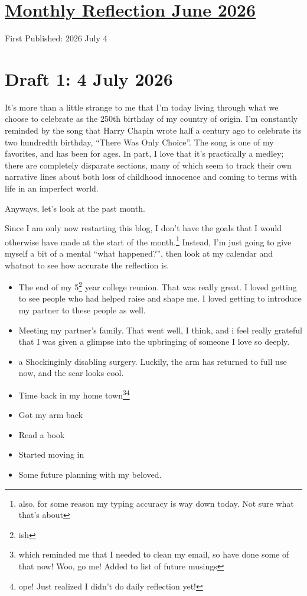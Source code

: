 \documentclass[12pt]{article}
\newcommand{\say}[1]{``#1''}
\renewcommand{\,}{\textsuperscript{,}}
\begin{document}
  
\doublespacing  
\section{\href{reflection-june-2026.html}{Monthly Reflection June 2026}}
First Published: 2026 July 4

\section{Draft 1: 4 July 2026}

It's more than a little strange to me that I'm today living through what we choose to celebrate as the 250th birthday of my country of origin.  
I'm constantly reminded by the song that Harry Chapin wrote half a century ago to celebrate its two hundredth birthday, \say{There Was Only Choice}.  
The song is one of my favorites, and has been for ages.  
In part, I love that it's practically a medley; there are completely disparate sections, many of which seem to track their own narrative lines about both loss of childhood innocence and coming to terms with life in an imperfect world.

Anyways, let's look at the past month.

Since I am only now restarting this blog, I don't have the goals that I would otherwise have made at the start of the month.\footnote{also, for some reason my typing accuracy is way down today. Not sure what that's about}  
Instead, I'm just going to give myself a bit of a mental \say{what happened?}, then look at my calendar and whatnot to see how accurate the reflection is.

\begin{itemize}  
\item The end of my 5\footnote{ish} year college reunion. That was really great. I loved getting to see people who had helped raise and shape me. I loved getting to introduce my partner to these people as well.  
\item Meeting my partner's family. That went well, I think, and i feel really grateful that I was given a glimpse into the upbringing of someone I love so deeply.  
\item a Shockinginly disabling surgery. Luckily, the arm has returned to full use now, and the scar looks cool.  
\item Time back in my home town\footnote{which reminded me that I needed to clean my email, so have done some of that now! Woo, go me! Added to list of future musings}\footnote{ope! Just realized I didn't do daily reflection yet!}  
\item Got my arm back  
\item Read a book  
\item Started moving in  
\item Some future planning with my beloved.  
\end{itemize}
\end{document}
